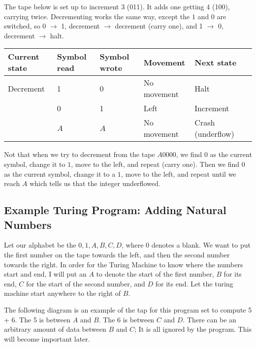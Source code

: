 \documentclass[11pt, letterpaper, twoside, openright]{book}
\begin{document}

The tape below is set up to increment 3 (011). It adds one getting 4 (100), carrying twice. Decrementing works the same way, except the $1$ and $0$ are switched, so 0 $\to$ 1, decrement $\to$ decrement (carry one), and 1 $\to$ 0,
decrement $\to$ halt.

\begin{tabular}{|l|l|l|l|l|l|}
\hline
Current state & Symbol read & Symbol wrote & Movement & Next state \\
\hline
Decrement & 1 & 0 & No movement & Halt \\
 & 0 & 1 & Left & Increment \\
 & $A$ & $A$ & No movement & Crash (underflow) \\
\hline
\end{tabular}

Not that when we try to decrement from the tape $A0000$, we find $0$ as the current symbol, change it to $1$, move to the left, and repeat (carry one). Then we find $0$ as the current symbol, change it to a $1$, move to the left, and repeat until we reach $A$ which tells us that the integer underflowed.


\subsection{Example Turing Program: Adding Natural Numbers}
Let our alphabet be the ${0, 1, A, B, C, D}$, where $0$ denotes a blank. We want to put the first number on the tape towards the left, and then the second number towards the right. In order for the Turing Machine to know where the numbers start and end, I will put an $A$ to denote the start of the first number, $B$ for its end, $C$ for the start of the second number, and $D$ for its end. Let the turing machine start anywhere to the right of $B$.

The following diagram is an example of the tap for this program set to compute 5 + 6. The 5 is between $A$ and $B$. The 6 is between $C$ and $D$. There can be an arbitrary amount of data between $B$ and $C$; It is all ignored by the program. This will become important later.
\end{document}
